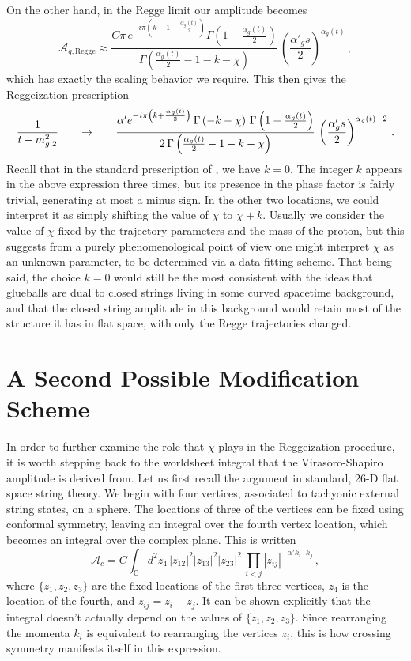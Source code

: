 \documentclass[aps, prd, preprintnumbers, floatfix, showpacs, showkeys, nofootinbib, 10pt]{revtex4-1}
\def\beq{\begin{equation}}
\def\eeq{\end{equation}}
\begin{document}
On the other hand, in the Regge limit our amplitude becomes 
\beq
\mathcal{A}_{g, \mathrm{Regge}} \approx \frac{C\pi \, e^{-i\pi\left(k - 1 + \frac{\alpha_g(t)}{2}\right)}\Gamma\left(1 - \frac{\alpha_g(t)}{2}\right)}{\Gamma\left(\frac{\alpha_g(t)}{2} - 1 - k - \chi\right)} \, \left(\frac{\alpha'_g s}{2}\right)^{\alpha_g(t)} \, ,
\eeq
which has exactly the scaling behavior we require.  This then gives the Reggeization prescription
\beq
\frac{1}{t - m_{g, 2}^2} \hspace{.25in} \rightarrow \hspace{.25in} \frac{\alpha' e^{-i\pi \left(k + \frac{\alpha_g(t)}{2}\right)} \, \Gamma\left(-k - \chi\right) \, \Gamma\left(1 - \frac{\alpha_g(t)}{2}\right)}{2 \, \Gamma\left(\frac{\alpha_g(t)}{2} - 1 - k - \chi\right)} \, \left(\frac{\alpha'_g s}{2}\right)^{\alpha_g(t) - 2} \, .
\eeq
Recall that in the standard prescription of \cite{DHM}, we have $k = 0$.  The integer $k$ appears in the above expression three times, but its presence in the phase factor is fairly trivial, generating at most a minus sign.  In the other two locations, we could interpret it as simply shifting the value of $\chi$ to $\chi + k$.  Usually we consider the value of $\chi$ fixed by the trajectory parameters and the mass of the proton, but this suggests from a purely phenomenological point of view one might interpret $\chi$ as an unknown parameter, to be determined via a data fitting scheme.  That being said, the choice $k = 0$ would still be the most consistent with the ideas that glueballs are dual to closed strings living in some curved spacetime background, and that the closed string amplitude in this background would retain most of the structure it has in flat space, with only the Regge trajectories changed.

\section{\label{mod2} A Second Possible Modification Scheme}

In order to further examine the role that $\chi$ plays in the Reggeization procedure, it is worth stepping back to the worldsheet integral that the Virasoro-Shapiro amplitude is derived from.  Let us first recall the argument in standard, 26-D flat space string theory.  We begin with four vertices, associated to tachyonic external string states, on a sphere.  The locations of three of the vertices can be fixed using conformal symmetry, leaving an integral over the fourth vertex location, which becomes an integral over the complex plane.  This is written
\beq
\label{eqn:wsintegral}
\mathcal{A}_{c} = C\int_{\mathbb{C}} d^2 z_4 \, |z_{12}|^2|z_{13}|^2|z_{23}|^2 \, \prod_{i < j} |z_{ij}|^{-\alpha' k_i\cdot k_j} \, ,
\eeq
where $\{z_1, z_2, z_3\}$ are the fixed locations of the first three vertices, $z_4$ is the location of the fourth, and $z_{ij} = z_i - z_j$.  It can be shown explicitly that the integral doesn't actually depend on the values of $\{z_1, z_2, z_3\}$.  Since rearranging the momenta $k_i$ is equivalent to rearranging the vertices $z_i$, this is how crossing symmetry manifests itself in this expression.   
\end{document}
